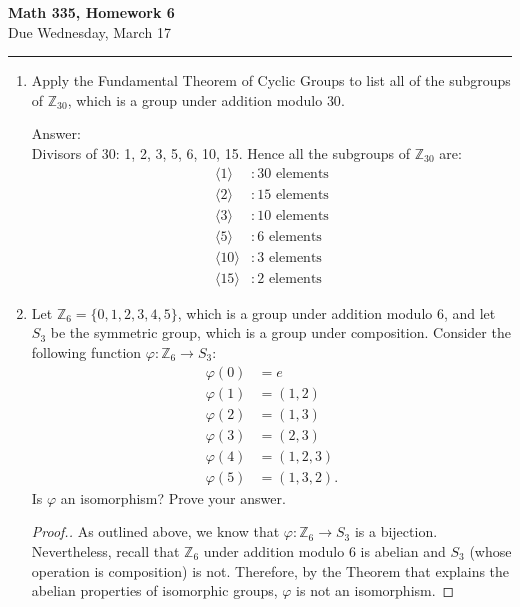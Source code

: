 \documentclass[11pt,twoside]{article}
\begin{document}
\begin{center}
{\bf \Large Math 335, Homework 6}\\
\vspace{0.1in}
{\Large Due Wednesday, March 17}
\vspace{0.1cm}
\end{center}

\hrule

\vspace{.2in}

\begin{enumerate}

\item Apply the Fundamental Theorem of Cyclic Groups to list all of the subgroups of $\mathbb{Z}_{30}$, which is a group under addition modulo $30$.

{\color{red}Answer:}\\
Divisors of 30: 1, 2, 3, 5, 6, 10, 15.  Hence all the subgroups of $\mathbb{Z}_{30}$ are:
\begin{align*}
\langle 1 \rangle &\colon 30 \text{ elements}\\
\langle 2 \rangle &\colon 15 \text{ elements}\\
\langle 3 \rangle &\colon 10 \text{ elements}\\
\langle 5 \rangle &\colon 6 \text{ elements}\\
\langle 10 \rangle &\colon 3 \text{ elements}\\
\langle 15 \rangle &\colon 2 \text{ elements}
\end{align*}

\vspace{0.5cm}

\item Let $\mathbb{Z}_6 = \{0,1,2,3,4,5\}$, which is a group under addition modulo $6$, and let $S_3$ be the symmetric group, which is a group under composition.  Consider the following function $\varphi: \mathbb{Z}_6 \rightarrow S_3$:
\begin{align*}
\varphi(0) &= e\\
\varphi(1) &= (1,2)\\
\varphi(2) &= (1,3)\\
\varphi(3) &= (2,3)\\
\varphi(4) &= (1,2,3)\\
\varphi(5) &= (1,3,2).
\end{align*}
Is $\varphi$ an isomorphism?  Prove your answer.

\begin{proof}[\color{red}Proof.]As outlined above, we know that $\varphi: \mathbb{Z}_6 \rightarrow S_3$ is a bijection.  Nevertheless, recall that $\mathbb{Z}_6$ under addition modulo 6 is abelian and $S_3$ (whose operation is composition) is not.  Therefore, by the Theorem that explains the abelian properties of isomorphic groups, $\varphi$ is not an isomorphism.
\end{proof}


\end{enumerate}
\end{document}
